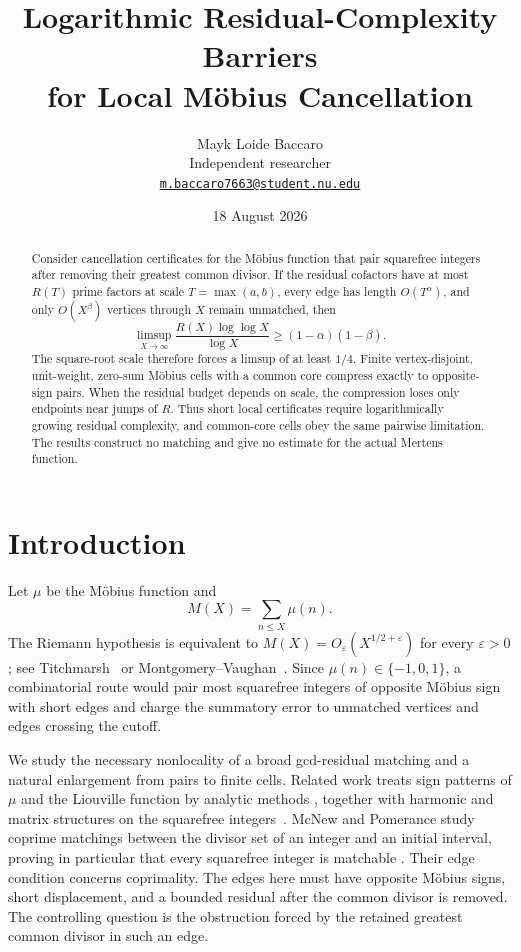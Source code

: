 \documentclass[11pt,a4paper]{amsart}
\title[Residual complexity for local M\"obius cancellation]
{Logarithmic Residual-Complexity Barriers\\
for Local M\"obius Cancellation}
\author[Mayk Loide Baccaro]{Mayk Loide Baccaro\\
Independent researcher\\
\href{mailto:m.baccaro7663@student.nu.edu}{\texttt{m.baccaro7663@student.nu.edu}}}
\date{18 August 2026}
\theoremstyle{definition}
\theoremstyle{remark}
\newcommand{\mob}{\mu}
\newcommand{\M}{M}
\begin{document}
\raggedbottom

\begin{abstract}
Consider cancellation certificates for the M\"obius function that pair
squarefree integers after removing their greatest common divisor.  If the
residual cofactors have at most $R(T)$ prime factors at scale
$T=\max(a,b)$, every edge has length $O(T^\alpha)$, and only
$O(X^\beta)$ vertices through $X$ remain unmatched, then
\[
 \limsup_{X\to\infty}\frac{R(X)\log\log X}{\log X}
 \geq (1-\alpha)(1-\beta).
\]
The square-root scale therefore forces a limsup of at least $1/4$.
Finite vertex-disjoint, unit-weight, zero-sum M\"obius cells with a common
core compress exactly to opposite-sign pairs.  When the residual budget
depends on scale, the compression loses only endpoints near jumps of $R$.
Thus short local certificates require logarithmically growing residual
complexity, and common-core cells obey the same pairwise limitation.  The
results construct no matching and give no estimate for the actual Mertens
function.
\end{abstract}

\maketitle
\enlargethispage{12pt}

\section{Introduction}

Let $\mob$ be the M\"obius function and
\[
 \M(X)=\sum_{n\leq X}\mob(n).
\]
The Riemann hypothesis is equivalent to
$\M(X)=O_\varepsilon(X^{1/2+\varepsilon})$ for every $\varepsilon>0$;
see Titchmarsh~\cite[Chapter XIV]{Titchmarsh1986} or
Montgomery--Vaughan~\cite[Chapter 15]{MontgomeryVaughan2007}.  Since
$\mob(n)\in\{-1,0,1\}$, a combinatorial route would pair most squarefree
integers of opposite M\"obius sign with short edges and charge the summatory
error to unmatched vertices and edges crossing the cutoff.

We study the necessary nonlocality of a broad gcd-residual matching and a
natural enlargement from pairs to finite cells.  Related work treats sign
patterns of $\mob$ and the Liouville function by analytic methods
\cite{MatomakiRadziwillTao2016}, together with harmonic and matrix structures
on the squarefree integers~\cite{Hilberdink2014}.  McNew and Pomerance study
coprime matchings between the divisor set of an integer and an initial
interval, proving in particular that every squarefree integer is matchable
\cite{McNewPomerance2026}.  Their edge condition concerns coprimality.  The
edges here must have opposite M\"obius signs, short displacement, and a bounded
residual after the common divisor is removed.  The controlling question is
the obstruction forced by the retained greatest common divisor in such an
edge.
\end{document}
